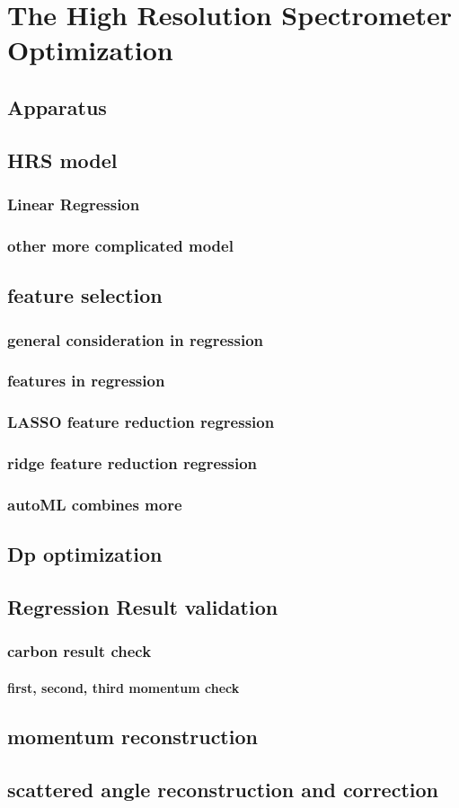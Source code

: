   \chapter{The High Resolution Spectrometer Optimization}

\section{Apparatus}
\section{HRS model}
\subsection{Linear Regression}
\subsection{other more complicated model}
\section{feature selection}
\subsection{general consideration in regression}
\subsection{features in regression}
\subsection{LASSO feature reduction regression}
\subsection{ridge feature reduction regression}
\subsection{autoML combines more}
\section{Dp optimization}
\section{Regression Result validation}
\subsection{carbon result check}
\subsubsection{first, second, third momentum check}
\section{momentum reconstruction}
\section{scattered angle reconstruction and correction}